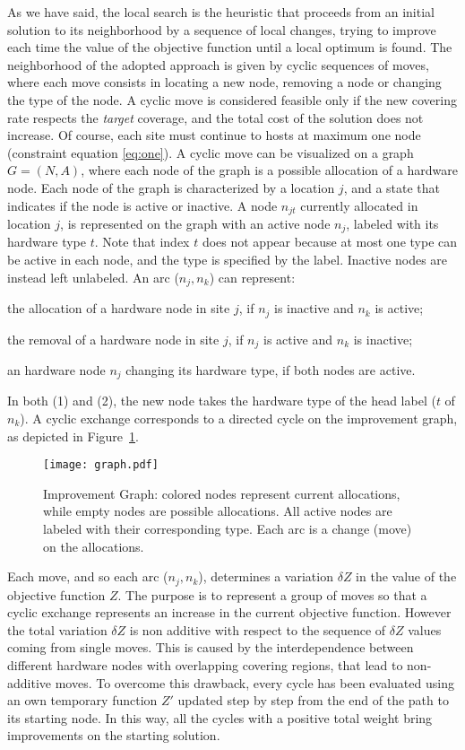 As we have said, the local search is the heuristic that proceeds from an initial solution to its neighborhood by a sequence of local changes, trying to improve each time the value of the objective function until a local optimum is found.
The neighborhood of the adopted approach is given by cyclic sequences of moves, where each move consists in locating a new node, removing a node or changing the type of the node. A cyclic move is considered feasible only if the new covering rate respects the \emph{target} coverage, and the total cost of the solution does not increase. Of course, each site must continue to hosts at maximum one node (constraint equation \eqref{eq:one}). A cyclic move can be visualized on a graph $G=(N,A)$, where each node of the graph is a possible allocation of a hardware node. Each node of the graph is characterized by a location $j$, and a state that indicates if the node is active or inactive. A node $n_{jt}$ currently allocated in location $j$, is represented on the graph with an active node $n_j$, labeled with its hardware type $t$. Note that index $t$ does not appear because at most one type can be active in each node, and the type is specified by the label. Inactive nodes are instead left unlabeled. An arc ($n_j, n_k$) can represent:
\begin{enumerate*}[label={(\arabic*)}]
\item the allocation of a hardware node in site $j$, if $n_j$ is inactive and $n_k$ is active;
\item the removal of a hardware node in site $j$, if $n_j$ is active and $n_k$ is inactive;
\item an hardware node $n_j$ changing its hardware type, if both nodes are active.
\end{enumerate*}
In both (1) and (2), the new node takes the hardware type of the head label ($t$ of $n_k$). A cyclic exchange corresponds to a directed cycle on the improvement graph, as depicted in Figure~\ref{fig:graph}. 
\begin{figure}[h!tb]
\centering\texttt{[image: graph.pdf]}
\caption{Improvement Graph: colored nodes represent current allocations, while empty nodes are possible allocations. All active nodes are labeled with their corresponding type. Each arc is a change (move) on the allocations.}
\label{fig:graph}
\end{figure}
Each move, and so each arc ($n_j, n_k$), determines a variation $\delta Z$ in the value of the objective function $Z$. The purpose is to represent a group of moves so that a cyclic exchange represents an increase in the current objective function. However the total variation $\delta Z$ is non additive with respect to the sequence of $\delta Z$ values coming from single moves. This is caused by the interdependence between different hardware nodes with overlapping covering regions, that lead to non-additive moves. To overcome this drawback, every cycle has been evaluated using an own temporary function $Z'$ updated step by step from the end of the path to its starting node. In this way, all the cycles with a positive total weight bring improvements on the starting solution.

